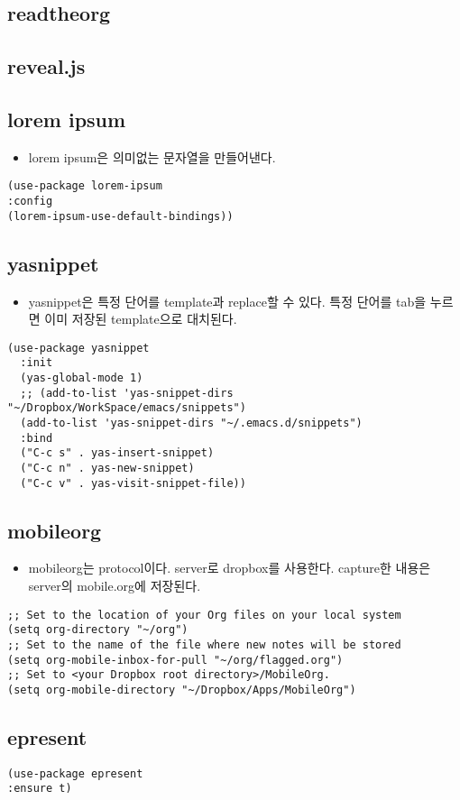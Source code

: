 \documentclass[11pt]{article}
\begin{document}
\subsection*{readtheorg}
\label{sec:orgaafbd5d}
\subsection*{reveal.js}
\label{sec:orgb867f26}

\subsection*{lorem ipsum}
\label{sec:orgf3a9196}
\begin{itemize}
\item lorem ipsum은 의미없는 문자열을 만들어낸다.
\end{itemize}
\begin{verbatim}
(use-package lorem-ipsum
:config
(lorem-ipsum-use-default-bindings))
\end{verbatim}
\subsection*{yasnippet}
\label{sec:org192841e}
\begin{itemize}
\item yasnippet은 특정 단어를  template과 replace할 수 있다. 특정 단어를 tab을 누르면 이미 저장된 template으로 대치된다.
\end{itemize}
\begin{verbatim}
(use-package yasnippet
  :init
  (yas-global-mode 1)
  ;; (add-to-list 'yas-snippet-dirs "~/Dropbox/WorkSpace/emacs/snippets")
  (add-to-list 'yas-snippet-dirs "~/.emacs.d/snippets")
  :bind
  ("C-c s" . yas-insert-snippet)
  ("C-c n" . yas-new-snippet)
  ("C-c v" . yas-visit-snippet-file))
\end{verbatim}
\subsection*{mobileorg}
\label{sec:org7a1f684}
\begin{itemize}
\item mobileorg는 protocol이다. server로 dropbox를 사용한다.
capture한 내용은 server의 mobile.org에 저장된다.
\end{itemize}
\begin{verbatim}
;; Set to the location of your Org files on your local system
(setq org-directory "~/org")
;; Set to the name of the file where new notes will be stored
(setq org-mobile-inbox-for-pull "~/org/flagged.org")
;; Set to <your Dropbox root directory>/MobileOrg.
(setq org-mobile-directory "~/Dropbox/Apps/MobileOrg")
\end{verbatim}
\subsection*{epresent}
\label{sec:org106c388}
\begin{verbatim}
(use-package epresent
:ensure t)
\end{verbatim}
\end{document}
